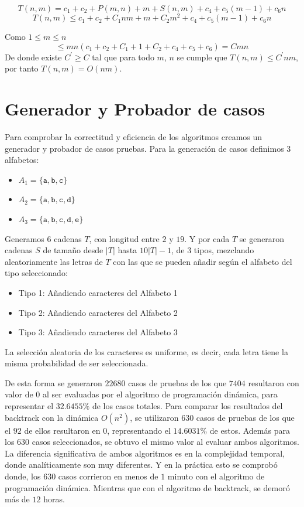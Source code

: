 \documentclass[a4paper]{article}
\begin{document}
    $$ T(n,m) = c_1 + c_2 + P(m,n) + m + S(n,m) + c_4 +c_5(m-1) + c_6n $$
	$$ T(n,m) \leq c_1 + c_2 + C_1nm + m + C_2m^2 + c_4 +c_5(m-1) + c_6n $$

    Como $1 \leq m\leq n$
    $$\leq mn (c_1 + c_2 + C_1 + 1 + C_2 + c_4 +c_5 + c_6) = Cmn $$
    De donde existe $C^{'} \geq C$ tal que para todo $m$, $n$ se cumple que $T(n,m) \leq C^{'}nm$,
    por tanto $T(n,m) = O(nm)$.

    \section*{Generador y Probador de casos}

	
	Para comprobar la correctitud y eficiencia de los algoritmos creamos un generador y probador de casos pruebas. Para la generación de casos definimos 3 alfabetos:
	\begin{itemize}
		\item $A_1 = \{\texttt{a},\texttt{b},\texttt{c}\}$
		\item $A_2 = \{\texttt{a},\texttt{b},\texttt{c},\texttt{d}\}$
		\item $A_3 = \{\texttt{a},\texttt{b},\texttt{c},\texttt{d},\texttt{e}\}$
	\end{itemize}

	Generamos $6$ cadenas $T$, con longitud entre $2$ y $19$. Y por cada $T$ se generaron cadenas $S$ de tamaño desde $|T|$ hasta $10|T|-1$, de $3$ tipos, mezclando aleatoriamente las letras de $T$ con las que se pueden añadir según el alfabeto del tipo seleccionado:
	\begin{itemize}
	\item Tipo 1: Añadiendo caracteres del Alfabeto 1
	\item Tipo 2: Añadiendo caracteres del Alfabeto 2
	\item Tipo 3: Añadiendo caracteres del Alfabeto 3
	\end{itemize}
	La selección aleatoria de los caracteres es uniforme, es decir, cada letra tiene la misma probabilidad de ser seleccionada.
	
	De esta forma se generaron $22680$ casos de pruebas de los que $7404$ resultaron con valor de $0$ al ser evaluadas por el algoritmo de programación dinámica, para representar el $32.6455\%$ de los casos totales. Para comparar los resultados del backtrack con la din\'amica $O(n^2)$, se utilizaron $630$ casos de pruebas de los que el $92$ de ellos resultaron en $0$, representando el $14.6031\%$ de estos. Además para los $630$ casos seleccionados, se obtuvo el mismo valor al evaluar ambos algoritmos. La diferencia significativa de ambos algoritmos es en la complejidad temporal, donde analíticamente son muy diferentes. Y en la práctica esto se comprobó donde, los $630$ casos corrieron en menos de $1$ minuto con el algoritmo de programación dinámica. Mientras que con el algoritmo de backtrack, se demoró más de $12$ horas.
	
\end{document}
